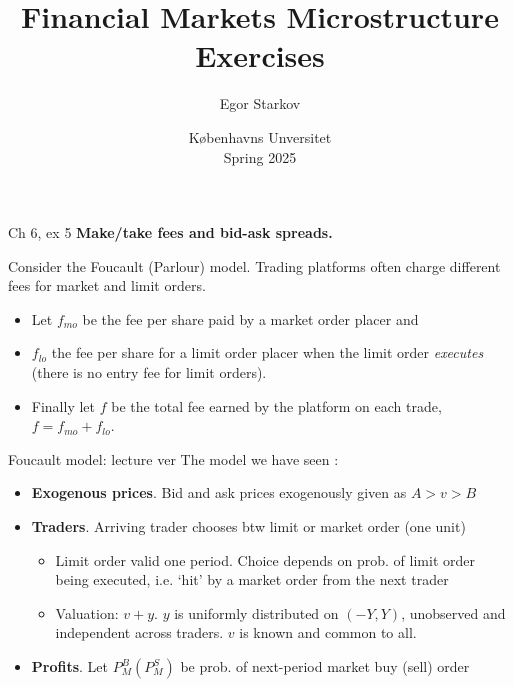 \documentclass[english,10pt
,aspectratio=169
]{beamer}
\title{Financial Markets Microstructure \\ Exercises}
\author{Egor Starkov}
\date{K{\o}benhavns Unversitet \\
	Spring 2025}
\begin{document}
%	






\begin{frame}{Ch 6, ex 5}
	\textbf{Make/take fees and bid-ask spreads.} 
	
	Consider the Foucault (Parlour) model. Trading platforms often charge different fees for market and limit orders. 
	\begin{itemize}
		\item Let $f_{mo}$ be the fee per share paid by a market order placer and 
		\item $f_{lo}$ the fee per share for a limit order placer when the limit order \emph{executes} (there is no entry fee for limit orders).
		\item Finally let $f$ be the total fee earned by the platform on each trade, $f=f_{mo}+f_{lo}$.
	\end{itemize}
\end{frame}


\begin{frame}{Foucault model: lecture ver}
	The model we have seen :
	\begin{itemize}
		\item \textbf{Exogenous prices}. Bid and ask prices exogenously given as $A>v>B$
		\item \textbf{Traders}. Arriving trader chooses btw limit or market order (one unit)
		\begin{itemize}
			\item Limit order valid one period. Choice depends on prob. of limit order being executed, i.e. `hit' by a market order from the next trader
			\item Valuation: $v+y$. $y$ is uniformly distributed on $(-Y,Y)$, unobserved and independent across traders. $v$ is known and common to all.
		\end{itemize}
		\item \textbf{Profits}. Let $P^B_M (P^S_M)$ be prob. of next-period market buy (sell) order
	\end{itemize}
\end{frame}
\end{document}
